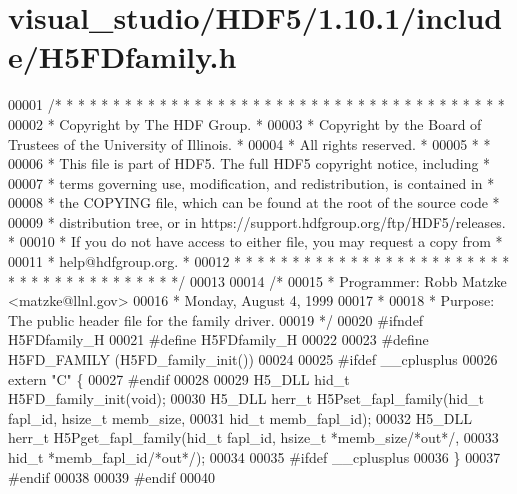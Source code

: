 \hypertarget{visual__studio_2_h_d_f5_21_810_81_2include_2_h5_f_dfamily_8h_source}{}\section{visual\+\_\+studio/\+H\+D\+F5/1.10.1/include/\+H5\+F\+Dfamily.h}
\label{visual__studio_2_h_d_f5_21_810_81_2include_2_h5_f_dfamily_8h_source}

\begin{DoxyCode}
00001 \textcolor{comment}{/* * * * * * * * * * * * * * * * * * * * * * * * * * * * * * * * * * * * * * *}
00002 \textcolor{comment}{ * Copyright by The HDF Group.                                               *}
00003 \textcolor{comment}{ * Copyright by the Board of Trustees of the University of Illinois.         *}
00004 \textcolor{comment}{ * All rights reserved.                                                      *}
00005 \textcolor{comment}{ *                                                                           *}
00006 \textcolor{comment}{ * This file is part of HDF5.  The full HDF5 copyright notice, including     *}
00007 \textcolor{comment}{ * terms governing use, modification, and redistribution, is contained in    *}
00008 \textcolor{comment}{ * the COPYING file, which can be found at the root of the source code       *}
00009 \textcolor{comment}{ * distribution tree, or in https://support.hdfgroup.org/ftp/HDF5/releases.  *}
00010 \textcolor{comment}{ * If you do not have access to either file, you may request a copy from     *}
00011 \textcolor{comment}{ * help@hdfgroup.org.                                                        *}
00012 \textcolor{comment}{ * * * * * * * * * * * * * * * * * * * * * * * * * * * * * * * * * * * * * * */}
00013 
00014 \textcolor{comment}{/*}
00015 \textcolor{comment}{ * Programmer:  Robb Matzke <matzke@llnl.gov>}
00016 \textcolor{comment}{ *              Monday, August  4, 1999}
00017 \textcolor{comment}{ *}
00018 \textcolor{comment}{ * Purpose: The public header file for the family driver.}
00019 \textcolor{comment}{ */}
00020 \textcolor{preprocessor}{#ifndef H5FDfamily\_H}
00021 \textcolor{preprocessor}{#define H5FDfamily\_H}
00022 
00023 \textcolor{preprocessor}{#define H5FD\_FAMILY (H5FD\_family\_init())}
00024 
00025 \textcolor{preprocessor}{#ifdef \_\_cplusplus}
00026 \textcolor{keyword}{extern} \textcolor{stringliteral}{"C"} \{
00027 \textcolor{preprocessor}{#endif}
00028 
00029 H5\_DLL hid\_t H5FD\_family\_init(\textcolor{keywordtype}{void});
00030 H5\_DLL herr\_t H5Pset\_fapl\_family(hid\_t fapl\_id, hsize\_t memb\_size,
00031               hid\_t memb\_fapl\_id);
00032 H5\_DLL herr\_t H5Pget\_fapl\_family(hid\_t fapl\_id, hsize\_t *memb\_size\textcolor{comment}{/*out*/},
00033               hid\_t *memb\_fapl\_id\textcolor{comment}{/*out*/});
00034 
00035 \textcolor{preprocessor}{#ifdef \_\_cplusplus}
00036 \}
00037 \textcolor{preprocessor}{#endif}
00038 
00039 \textcolor{preprocessor}{#endif}
00040 
\end{DoxyCode}
